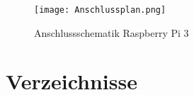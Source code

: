 \documentclass[a4paper,12pt]{article}
\begin{document}
\begin{figure}[H]	%
\begin{center}
\texttt{[image: Anschlussplan.png]}
\caption{Anschlussschematik Raspberry Pi 3}
\label{Anschlussplan}
\end{center}
\end{figure}

\newpage

\section{Verzeichnisse}
\listoffigures %
\end{document}
